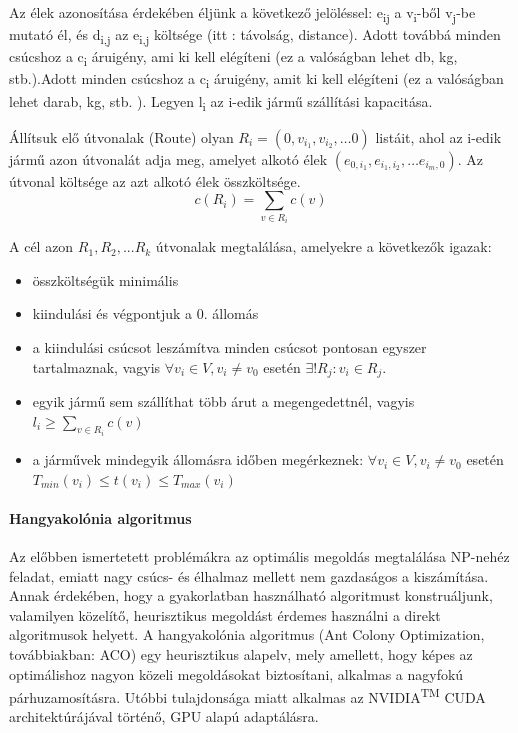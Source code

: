 Az élek azonosítása érdekében éljünk a következő jelöléssel: e\textsubscript{ij} a v\textsubscript{i}-ből v\textsubscript{j}-be mutató él, és d\textsubscript{i,j} az e\textsubscript{i,j} költsége (itt : távolság, distance). Adott továbbá minden csúcshoz a c\textsubscript{i} áruigény, ami ki kell elégíteni (ez a valóságban lehet db, kg, stb.).Adott minden csúcshoz a c\textsubscript{i} áruigény, amit ki kell elégíteni (ez a valóságban lehet darab, kg, stb. ).  Legyen l\textsubscript{i} az i-edik jármű szállítási kapacitása.

Állítsuk elő útvonalak (Route) olyan \( R_{i} = (0, v_{i_1}, v_{i_2}, \dots 0) \) listáit,
ahol az i-edik jármű azon útvonalát adja meg, amelyet alkotó élek 
\( (e_{0,i_{1}}, e_{i_{1},i_{2}}, \dots e_{i_{m},0}) \). Az útvonal költsége az azt alkotó élek összköltsége. 
\begin{equation}
	c(R_i) = \sum_{v \in R_i} c(v)
\end{equation}


A cél azon \(R_1,R_2,...R_k \) útvonalak megtalálása, amelyekre a következők igazak:
\begin{itemize}
	\item összköltségük minimális
	\item kiindulási és végpontjuk a 0. állomás
	\item a kiindulási csúcsot leszámítva minden csúcsot pontosan egyszer tartalmaznak, vagyis \(\forall v_i \in V, v_i\ne v_0\) esetén \( \exists!R_j : v_i \in R_j \). 
	\item egyik jármű sem szállíthat több árut a megengedettnél, vagyis \(l_i \geqslant \sum_{v \in R_i} c(v) \)
	\item a járművek mindegyik állomásra időben megérkeznek: \(\forall v_i \in V, v_i\ne v_0\) esetén \( T_{min}(v_i) \leqslant t(v_i) \leqslant T_{max}(v_i) \)
\end{itemize}


\paragraph{Hangyakolónia algoritmus \cite{alg_optim}}
Az előbben ismertetett problémákra az optimális megoldás megtalálása NP-nehéz feladat, emiatt nagy csúcs- és élhalmaz mellett nem gazdaságos a kiszámítása. Annak érdekében, hogy a 
gyakorlatban használható algoritmust konstruáljunk, valamilyen közelítő, heurisztikus megoldást érdemes használni a direkt algoritmusok helyett. A hangyakolónia algoritmus (Ant Colony Optimization, továbbiakban: ACO) egy heurisztikus alapelv, mely amellett, hogy képes az optimálishoz nagyon közeli megoldásokat biztosítani, alkalmas a nagyfokú párhuzamosításra. Utóbbi tulajdonsága miatt alkalmas az NVIDIA\textsuperscript{TM} CUDA architektúrájával történő, GPU alapú adaptálásra.

